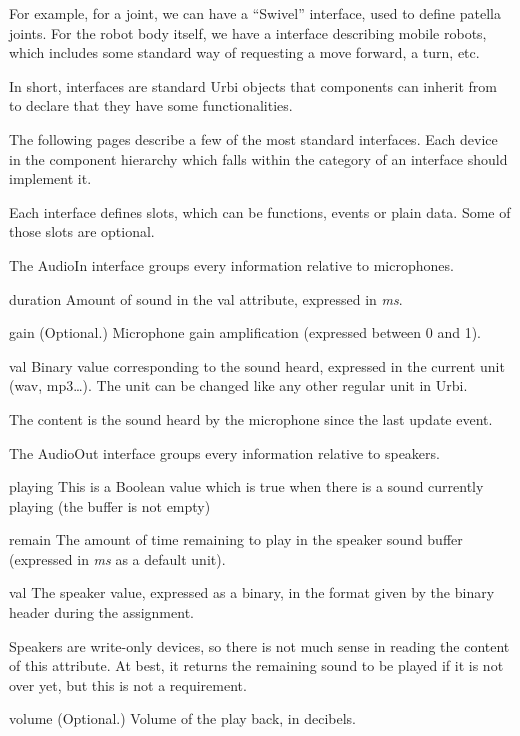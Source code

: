 For example, for a joint, we can have a ``Swivel'' interface, used to define
patella joints. For the robot body itself, we have a 
interface describing mobile robots, which includes some standard way of
requesting a move forward, a turn, etc.

In short, interfaces are standard Urbi objects that components can inherit
from to declare that they have some functionalities.

The following pages describe a few of the most standard interfaces. Each
device in the component hierarchy which falls within the category of an
interface should implement it.

Each interface defines slots, which can be functions, events or plain data.
Some of those slots are optional.



The AudioIn interface groups every information relative to microphones.

\begin{urbiscriptapi}
\item[duration] Amount of sound in the val attribute, expressed in
  \textit{ms}.


\item[gain]{} (Optional.) Microphone gain amplification (expressed between 0
  and 1).


\item[val] Binary value corresponding to the sound heard, expressed in the
  current unit (wav, mp3\ldots). The unit can be changed like any other regular
  unit in Urbi.

  The content is the sound heard by the microphone since the last update
  event.
\end{urbiscriptapi}


The AudioOut interface groups every information relative to speakers.

\begin{urbiscriptapi}
\item[playing] This is a Boolean value which is true when there is a sound
  currently playing (the buffer is not empty)%


\item[remain] The amount of time remaining to play in the speaker sound
  buffer (expressed in \textit{ms} as a default unit).


\item[val] The speaker value, expressed as a binary, in the format given by
  the binary header during the assignment.

  Speakers are write-only devices, so there is not much sense in reading the
  content of this attribute. At best, it returns the remaining sound to be
  played if it is not over yet, but this is not a requirement.


\item[volume]{} (Optional.) Volume of the play back, in decibels.
\end{urbiscriptapi}



